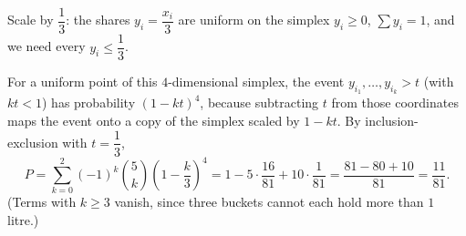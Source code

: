 Scale by $\dfrac13$: the shares $y_i=\dfrac{x_i}3$ are uniform on the simplex $y_i\ge0$, $\sum y_i=1$, and we need every $y_i\le\dfrac13$.

For a uniform point of this $4$-dimensional simplex, the event $y_{i_1},\dots,y_{i_k}>t$ (with $kt<1$) has probability $(1-kt)^4$, because subtracting $t$ from those coordinates maps the event onto a copy of the simplex scaled by $1-kt$. By inclusion-exclusion with $t=\dfrac13$,
\[P=\sum_{k=0}^{2}(-1)^k\binom5k\left(1-\dfrac k3\right)^4=1-5\cdot\dfrac{16}{81}+10\cdot\dfrac1{81}=\dfrac{81-80+10}{81}=\boxed{\dfrac{11}{81}}.\]
(Terms with $k\ge3$ vanish, since three buckets cannot each hold more than $1$ litre.)
